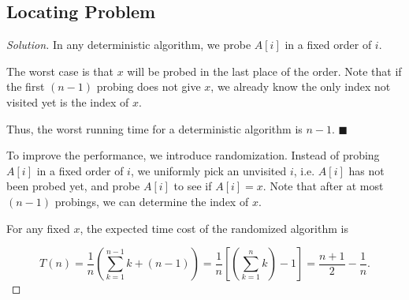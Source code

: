 \documentclass{article}
\renewcommand{\qedsymbol}{\hfill $\blacksquare$\par}
\newenvironment{solution}{\begin{proof}[\noindent\it Solution]}{\end{proof}}
\begin{document}
\subsection{Locating Problem}
\vspace{1em}
\begin{solution}
    In any deterministic algorithm, we probe $A[i]$ in a fixed order of $i$. 
    
    \hspace{2.6em}
    The worst case is that $x$ will be probed in the last place of the order. Note that if the first $(n-1)$ probing does not give $x$, we already know the only index not visited yet is the index of $x$. 
    
    \hspace{2.6em}
    Thus, the worst running time for a deterministic algorithm is $n-1$. \qedsymbol
    
    \vspace{1em} \hspace{2.6em}
    To improve the performance, we introduce randomization. Instead of probing $A[i]$ in a fixed order of $i$, we uniformly pick an unvisited $i$, i.e. $A[i]$ has not been probed yet, and probe $A[i]$ to see if $A[i]=x$. Note that after at most $(n-1)$ probings, we can determine the index of $x$.
    
    \hspace{2.6em}
    For any fixed $x$, the expected time cost of the randomized algorithm is 
    
    $$T(n)=\frac{1}{n}\left(\sum_{k=1}^{n-1}k+(n-1)\right)=\frac{1}{n}\left[\left(\sum_{k=1}^nk\right)-1\right]=\frac{n+1}{2}-\frac{1}{n}.$$
    
    \vspace{-2.7em}
\end{solution}

\vspace{3em}
\end{document}
